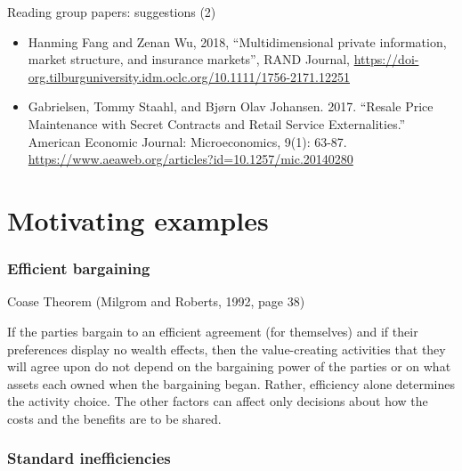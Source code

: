 \documentclass[11pt,english]{beamer}
\begin{document}
\begin{frame}{Reading group papers: suggestions (2)}
  \begin{itemize}
  \item Hanming Fang and Zenan Wu, 2018, ``Multidimensional private information, market structure, and insurance markets'', RAND Journal, \url{https://doi-org.tilburguniversity.idm.oclc.org/10.1111/1756-2171.12251}
  \item Gabrielsen, Tommy Staahl, and Bjørn Olav Johansen. 2017. ``Resale Price Maintenance with Secret Contracts and Retail Service Externalities.'' American Economic Journal: Microeconomics, 9(1): 63-87. \url{https://www.aeaweb.org/articles?id=10.1257/mic.20140280}      
  \end{itemize}
\end{frame}

\part[lecture 1]{Motivating examples}

\section{Efficient bargaining}

\begin{frame}{Coase Theorem (Milgrom and Roberts,
    1992, page 38)}

If the parties bargain to an efficient agreement
(for themselves) and if their preferences display
no wealth effects, then the value-creating activities
that they will agree upon do not depend on the
bargaining power of the parties or on what assets
each owned when the bargaining began. Rather,
efficiency alone determines the activity choice.
The other factors can affect only decisions about
how the costs and the benefits are to be shared.
\end{frame}

\section{Standard inefficiencies}
\end{document}
